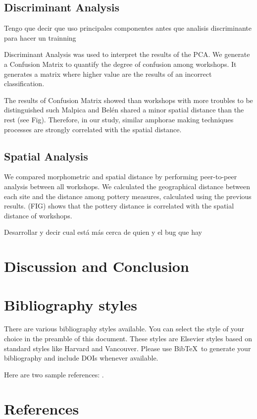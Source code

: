\documentclass[review, twocolumn]{elsarticle}
\begin{document}
\subsection{Discriminant Analysis}

Tengo que decir que uso principales componentes antes que analisis discriminante para hacer un trainning 

Discriminant Analysis was used to interpret the results of the PCA. We generate a Confusion Matrix to quantify the degree of confusion among workshops. It generates a matrix where higher value are the results of an incorrect classification. 





The results of Confusion Matrix showed than workshops with more troubles to be distinguished such Malpica and Belén shared a minor spatial distance than the rest (see Fig). Therefore, in our study, similar amphorae making techniques processes are strongly correlated with the spatial distance. 

\subsection{Spatial Analysis}

We compared morphometric and spatial distance by performing peer-to-peer analysis between all workshops. We calculated the geographical distance between each site and the distance among pottery measures, calculated using the previous results. (FIG) shows that the pottery distance is correlated with the spatial distance of workshops.

Desarrollar y decir cual está más cerca de quien y el bug que hay


\section{Discussion and Conclusion}

\section{Bibliography styles}

There are various bibliography styles available. You can select the style of your choice in the preamble of this document. These styles are Elsevier styles based on standard styles like Harvard and Vancouver. Please use Bib\TeX\ to generate your bibliography and include DOIs whenever available.

Here are two sample references: \cite{Feynman1963118,Dirac1953888}.

\section*{References}


\end{document}

